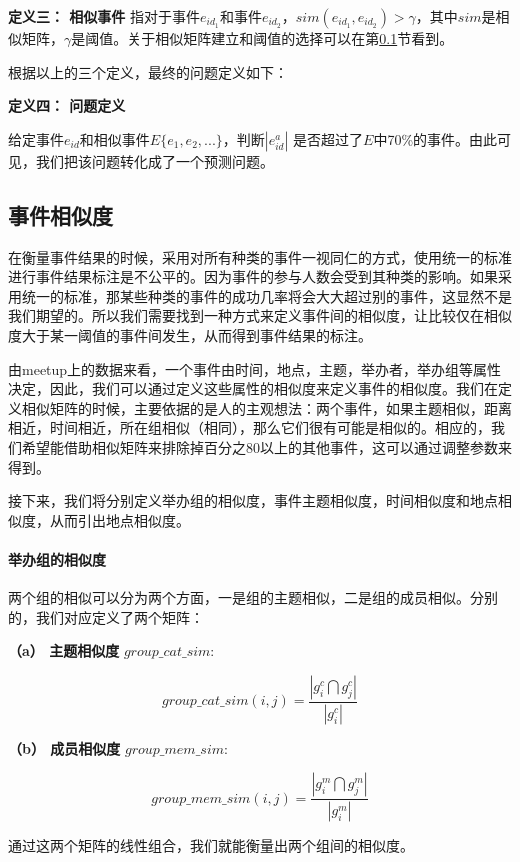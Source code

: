 \documentclass[12pt]{template}
\begin{document}
\textbf{定义三： 相似事件}
指对于事件\(e_{id_1}\)和事件\(e_{id_2}\)，\(sim(e_{id_1},e_{id_2})>\gamma\)，其中\(sim\)是相似矩阵，\(\gamma\)是阈值。关于相似矩阵建立和阈值的选择可以在第\ref{s1-4}节看到。

根据以上的三个定义，最终的问题定义如下：
\newline

\textbf{定义四： 问题定义}

给定事件\(e_{id}\)和相似事件\(E\{e_1,e_2,...\}\)，判断\(|e_{id}^a|\)
是否超过了\(E\)中70\%的事件。由此可见，我们把该问题转化成了一个预测问题。
\subsection{事件相似度}\label{s1-4}
在衡量事件结果的时候，采用对所有种类的事件一视同仁的方式，使用统一的标准进行事件结果标注是不公平的。因为事件的参与人数会受到其种类的影响。如果采用统一的标准，那某些种类的事件的成功几率将会大大超过别的事件，这显然不是我们期望的。所以我们需要找到一种方式来定义事件间的相似度，让比较仅在相似度大于某一阈值的事件间发生，从而得到事件结果的标注。

由meetup上的数据来看，一个事件由时间，地点，主题，举办者，举办组等属性决定，因此，我们可以通过定义这些属性的相似度来定义事件的相似度。我们在定义相似矩阵的时候，主要依据的是人的主观想法：两个事件，如果主题相似，距离相近，时间相近，所在组相似（相同），那么它们很有可能是相似的。相应的，我们希望能借助相似矩阵来排除掉百分之80以上的其他事件，这可以通过调整参数来得到。

接下来，我们将分别定义举办组的相似度，事件主题相似度，时间相似度和地点相似度，从而引出地点相似度。
\paragraph{举办组的相似度}
两个组的相似可以分为两个方面，一是组的主题相似，二是组的成员相似。分别的，我们对应定义了两个矩阵：

\textbf{（a） 主题相似度} \(group\_cat\_sim:\)

\begin{equation}
group\_cat\_sim(i,j)=\frac{|g_i^c\bigcap g_j^c|}{|g_i^c|}
\end{equation}


\textbf{（b） 成员相似度} \(group\_mem\_sim:\)

\begin{equation}
group\_mem\_sim(i,j)=\frac{|g_i^m\bigcap g_j^m|}{|g_i^m|}
\end{equation}

通过这两个矩阵的线性组合，我们就能衡量出两个组间的相似度。
\end{document}
